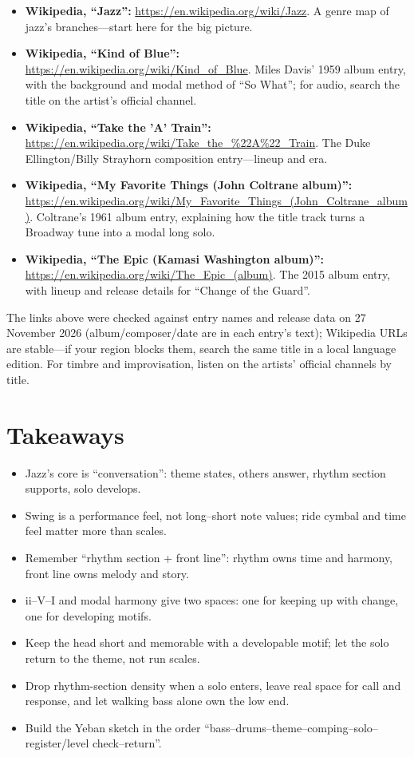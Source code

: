 \begin{sloppypar}
\begin{itemize}
\item \textbf{Wikipedia, ``Jazz'':} \url{https://en.wikipedia.org/wiki/Jazz}. A genre map of jazz's branches---start here for the big picture.
\item \textbf{Wikipedia, ``Kind of Blue'':} \url{https://en.wikipedia.org/wiki/Kind_of_Blue}. Miles Davis' 1959 album entry, with the background and modal method of ``So What''; for audio, search the title on the artist's official channel.
\item \textbf{Wikipedia, ``Take the 'A' Train'':} \url{https://en.wikipedia.org/wiki/Take_the_%22A%22_Train}. The Duke Ellington/Billy Strayhorn composition entry---lineup and era.
\item \textbf{Wikipedia, ``My Favorite Things (John Coltrane album)'':} \url{https://en.wikipedia.org/wiki/My_Favorite_Things_(John_Coltrane_album)}. Coltrane's 1961 album entry, explaining how the title track turns a Broadway tune into a modal long solo.
\item \textbf{Wikipedia, ``The Epic (Kamasi Washington album)'':} \url{https://en.wikipedia.org/wiki/The_Epic_(album)}. The 2015 album entry, with lineup and release details for ``Change of the Guard''.
\end{itemize}
\end{sloppypar}

The links above were checked against entry names and release data on 27 November 2026 (album/composer/date are in each entry's text); Wikipedia URLs are stable---if your region blocks them, search the same title in a local language edition. For timbre and improvisation, listen on the artists' official channels by title.

\section{Takeaways}
\label{sec:jazz-takeaways}

\begin{itemize}
\item Jazz's core is ``conversation'': theme states, others answer, rhythm section supports, solo develops.
\item Swing is a performance feel, not long--short note values; ride cymbal and time feel matter more than scales.
\item Remember ``rhythm section + front line'': rhythm owns time and harmony, front line owns melody and story.
\item ii--V--I and modal harmony give two spaces: one for keeping up with change, one for developing motifs.
\item Keep the head short and memorable with a developable motif; let the solo return to the theme, not run scales.
\item Drop rhythm-section density when a solo enters, leave real space for call and response, and let walking bass alone own the low end.
\item Build the Yeban sketch in the order ``bass--drums--theme--comping--solo--register/level check--return''.
\end{itemize}

